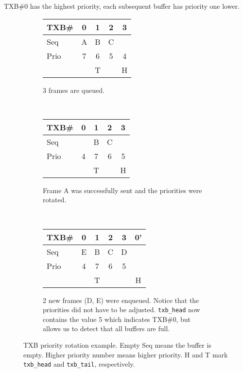 TXB\#0 has the highest priority, each subsequent buffer has priority one lower.

\begin{figure}
    \centering
    \begin{subfigure}[t]{0.32\textwidth}
    \begin{tabular}{lc|c|c|c}
    TXB\# & 0 & 1 & 2 & 3 \\\hline
    Seq   & A & B & C &   \\
    Prio  & 7 & 6 & 5 & 4 \\\hline
          &   & T &   & H \\
    \end{tabular}
    \caption{3 frames are queued.}
    \end{subfigure}
    ~%
    \noindent
    \begin{subfigure}[t]{0.32\textwidth}
    \begin{tabular}{lc|c|c|c}
    TXB\# & 0 & 1 & 2 & 3 \\\hline
    Seq   &   & B & C &   \\
    Prio  & 4 & 7 & 6 & 5 \\\hline
          &   & T &   & H \\
    \end{tabular}
    \caption{Frame A was successfully sent and the priorities were rotated.}
    \end{subfigure}
    ~%
    \noindent
    \begin{subfigure}[t]{0.32\textwidth}
    \begin{tabular}{lc|c|c|c|c}
    TXB\# & 0 & 1 & 2 & 3 & 0' \\\hline
    Seq   & E & B & C & D &    \\
    Prio  & 4 & 7 & 6 & 5 &    \\\hline
          &   & T &   &   & H  \\
    \end{tabular}
    \cprotect\caption{2 new frames (D, E) were enqueued. Notice that the
        priorities did not have to be adjusted. \verb|txb_head| now contains the
        value 5 which indicates TXB\#0, but allows us to detect that all buffers
        are full.}
    \end{subfigure}
    \cprotect\caption{TXB priority rotation example. Empty Seq means the buffer
        is empty. Higher priority number means higher priority. H and T mark
        \verb|txb_head| and \verb|txb_tail|, respectively.}
\end{figure}

